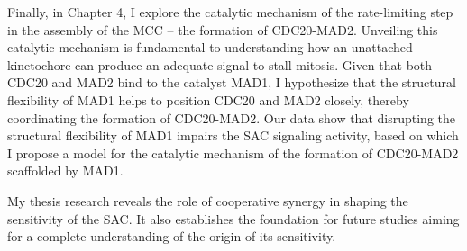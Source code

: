 Finally, in Chapter 4, I explore the catalytic mechanism of the rate-limiting step in the assembly of the MCC -- the formation of CDC20-MAD2. Unveiling this catalytic mechanism is fundamental to understanding how an unattached kinetochore can produce an adequate signal to stall mitosis. Given that both CDC20 and MAD2 bind to the catalyst MAD1, I hypothesize that the structural flexibility of MAD1 helps to position CDC20 and MAD2 closely, thereby coordinating the formation of CDC20-MAD2. Our data show that disrupting the structural flexibility of MAD1 impairs the SAC signaling activity, based on which I propose a model for the catalytic mechanism of the formation of CDC20-MAD2 scaffolded by MAD1.

My thesis research reveals the role of cooperative synergy in shaping the sensitivity of the SAC. It also establishes the foundation for future studies aiming for a complete understanding of the origin of its sensitivity.